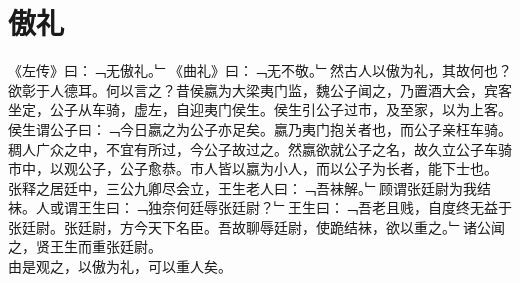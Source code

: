 \chapter{傲礼}%
《左传》曰：﹁无傲礼。﹂《曲礼》曰：﹁无不敬。﹂然古人以傲为礼，其故何也？欲彰于人德耳。何以言之？昔侯嬴为大梁夷门监，魏公子闻之，乃置酒大会，宾客坐定，公子从车骑，虚左，自迎夷门侯生。侯生引公子过市，及至家，以为上客。侯生谓公子曰：﹁今日嬴之为公子亦足矣。嬴乃夷门抱关者也，而公子亲枉车骑。稠人广众之中，不宜有所过，今公子故过之。然嬴欲就公子之名，故久立公子车骑市中，以观公子，公子愈恭。市人皆以嬴为小人，而以公子为长者，能下士也。\\
张释之居廷中，三公九卿尽会立，王生老人曰：﹁吾袜解。﹂顾谓张廷尉为我结袜。人或谓王生曰：﹁独奈何廷辱张廷尉？﹂王生曰：﹁吾老且贱，自度终无益于张廷尉。张廷尉，方今天下名臣。吾故聊辱廷尉，使跪结袜，欲以重之。﹂诸公闻之，贤王生而重张廷尉。\\
由是观之，以傲为礼，可以重人矣。
\\%
%
